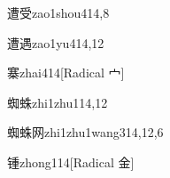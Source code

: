 \begin{verbete}{遭受}{zao1shou4}{14,8}
\end{verbete}

\begin{verbete}{遭遇}{zao1yu4}{14,12}
\end{verbete}

\begin{verbete}{寨}{zhai4}{14}[Radical 宀]
\end{verbete}

\begin{verbete}{蜘蛛}{zhi1zhu1}{14,12}
\end{verbete}

\begin{verbete}{蜘蛛网}{zhi1zhu1wang3}{14,12,6}
\end{verbete}

\begin{verbete}{锺}{zhong1}{14}[Radical 金]
\end{verbete}


